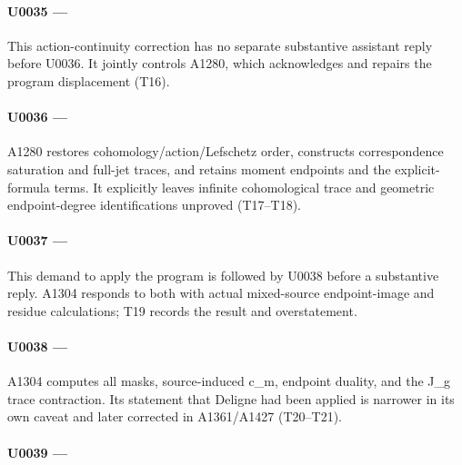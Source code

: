 \paragraph{\texorpdfstring{U0035 ---
\protect{}}{U0035 --- }}\label{u0035-7b9f7612-3a57-4687-9bfb-39d1d933baf8}

This action-continuity correction has no separate substantive assistant
reply before U0036. It jointly controls A1280, which acknowledges and
repairs the program displacement (T16).

\paragraph{\texorpdfstring{U0036 ---
\protect{}}{U0036 --- }}\label{u0036-d6542f7d-b917-4de5-b35d-07062f16e9c1}

A1280 restores cohomology/action/Lefschetz order, constructs
correspondence saturation and full-jet traces, and retains moment
endpoints and the explicit-formula terms. It explicitly leaves infinite
cohomological trace and geometric endpoint-degree identifications
unproved (T17--T18).

\paragraph{\texorpdfstring{U0037 ---
\protect{}}{U0037 --- }}\label{u0037-8b2110e7-195b-42d0-8c86-7277004e35fd}

This demand to apply the program is followed by U0038 before a
substantive reply. A1304 responds to both with actual mixed-source
endpoint-image and residue calculations; T19 records the result and
overstatement.

\paragraph{\texorpdfstring{U0038 ---
\protect{}}{U0038 --- }}\label{u0038-4ab2ff8f-915a-417d-876f-7294ed662b24}

A1304 computes all masks, source-induced c\_m, endpoint duality, and the
J\_g trace contraction. Its statement that Deligne had been applied is
narrower in its own caveat and later corrected in A1361/A1427
(T20--T21).

\paragraph{\texorpdfstring{U0039 ---
\protect{}}{U0039 --- }}\label{u0039-71c1d5ee-668e-4eea-ac21-d844702248ea}

